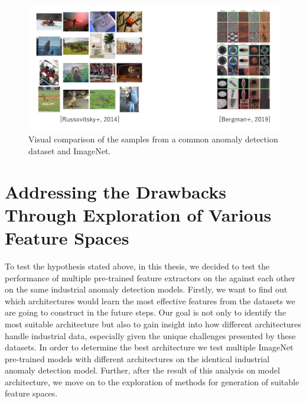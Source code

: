 \begin{figure}[h]
	\begin{center}
		\includegraphics[width=1.0\linewidth]{Chapter_3/discrepancy.png}
	\end{center}
	\caption{Visual comparison of the samples from a common anomaly detection dataset and ImageNet.}
	\label{fig:discrepancy}
\end{figure} 	

\section{Addressing the Drawbacks Through Exploration of Various Feature Spaces}
To test the hypothesis stated above, in this thesis, we decided to test the performance of multiple pre-trained feature extractors on the against each other on the same industrial anomaly detection models. Firstly, we want to find out which architectures would learn the most effective features from the datasets we are going to construct in the future steps. Our goal is not only to identify the most suitable architecture but also to gain insight into how different architectures handle industrial data, especially given the unique challenges presented by these datasets. In order to determine the best architecture we test multiple ImageNet pre-trained models with different architectures on the identical industrial anomaly detection model. Further, after the result of this analysis on model architecture, we move on to the exploration of methods for generation of suitable feature spaces.

